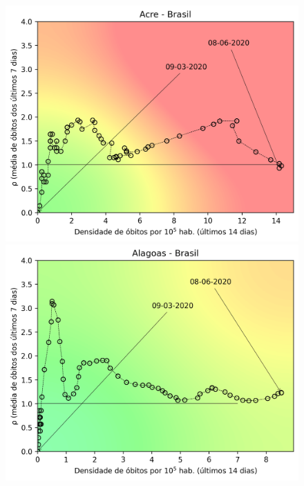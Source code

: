 \documentclass[]{article}
\begin{document}

\begin{figure}[!h]
	\centering
	\begin{minipage}[t]{4cm}
		\centering
		\includegraphics[scale=0.5]{../AC.png}
	\end{minipage}
	\hspace{5cm}
	\begin{minipage}[t]{4cm}
		\centering
		\includegraphics[scale=0.5]{../AL.png}
			\vspace{0.2cm}
	\end{minipage}


\end{figure}
\end{document}
